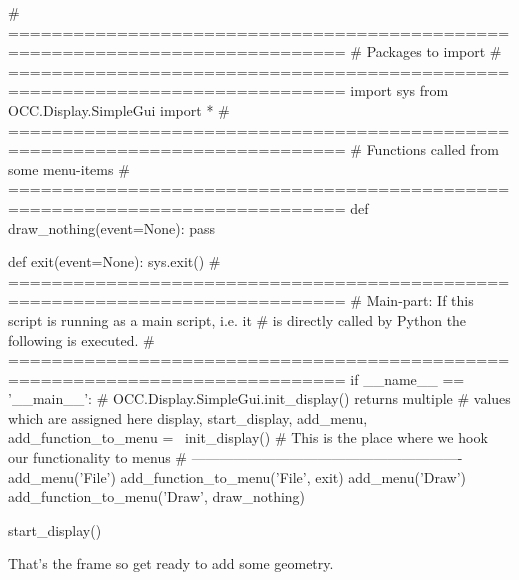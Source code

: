 \pagebreak
\begin{python}[moreemph={[4], 46, 48},caption={Step1.py - The program frame},label=LISTING_STEP1_PY]
# =============================================================================
# Packages to import
# =============================================================================
import sys
from OCC.Display.SimpleGui import * 
# =============================================================================
# Functions called from some menu-items
# =============================================================================
def draw_nothing(event=None):
    pass

def exit(event=None):
    sys.exit()
# =============================================================================
# Main-part: If this script is running as a main script, i.e. it 
# is directly called by Python the following is executed.
# =============================================================================
if __name__ == '__main__':
    # OCC.Display.SimpleGui.init_display() returns multiple
    # values which are assigned here
    display, start_display, add_menu, add_function_to_menu = \
        init_display()
    # This is the place where we hook our functionality to menus
    # ----------------------------------------------------------
    add_menu('File')
    add_function_to_menu('File',  exit)
    add_menu('Draw')
    add_function_to_menu('Draw', draw_nothing)
    
    start_display()
\end{python}

That's the frame so get ready to add some geometry.
